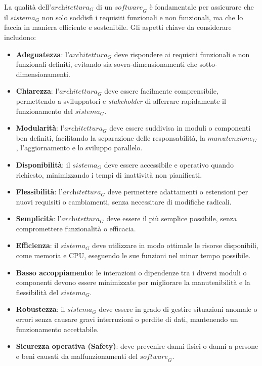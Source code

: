 La qualità dell'$\textit{architettura}_G$ di un $\textit{software}_G$ è fondamentale per assicurare che il $\textit{sistema}_G$ non solo soddisfi i requisiti funzionali e non funzionali, ma che lo faccia in maniera efficiente e sostenibile. Gli aspetti chiave da considerare includono:
\begin{itemize}
\item \textbf{Adeguatezza}: l'$\textit{architettura}_G$ deve rispondere ai requisiti funzionali e non funzionali definiti, evitando sia sovra-dimensionamenti che sotto-dimensionamenti.
\item \textbf{Chiarezza}: l'$\textit{architettura}_G$ deve essere facilmente comprensibile, permettendo a sviluppatori e \textit{stakeholder} di afferrare rapidamente il funzionamento del $\textit{sistema}_G$.
\item \textbf{Modularità}: l'$\textit{architettura}_G$ deve essere suddivisa in moduli o componenti ben definiti, facilitando la separazione delle responsabilità, la $\textit{manutenzione}_G$, l'aggiornamento e lo sviluppo parallelo.
\item \textbf{Disponibilità}: il $\textit{sistema}_G$ deve essere accessibile e operativo quando richiesto, minimizzando i tempi di inattività non pianificati.
\item \textbf{Flessibilità}: l'$\textit{architettura}_G$ deve permettere adattamenti o estensioni per nuovi requisiti o cambiamenti, senza necessitare di modifiche radicali.
\item \textbf{Semplicità}: l'$\textit{architettura}_G$ deve essere il più semplice possibile, senza compromettere funzionalità o efficacia.
\item \textbf{Efficienza}: il $\textit{sistema}_G$ deve utilizzare in modo ottimale le risorse disponibili, come memoria e CPU, eseguendo le sue funzioni nel minor tempo possibile.
\item \textbf{Basso accoppiamento}: le interazioni o dipendenze tra i diversi moduli o componenti devono essere minimizzate per migliorare la manutenibilità e la flessibilità del $\textit{sistema}_G$.
\item \textbf{Robustezza}: il $\textit{sistema}_G$ deve essere in grado di gestire situazioni anomale o errori senza causare gravi interruzioni o perdite di dati, mantenendo un funzionamento accettabile.
\item \textbf{Sicurezza operativa (Safety)}: deve prevenire danni fisici o danni a persone e beni causati da malfunzionamenti del $\textit{software}_G$.

\end{itemize}
